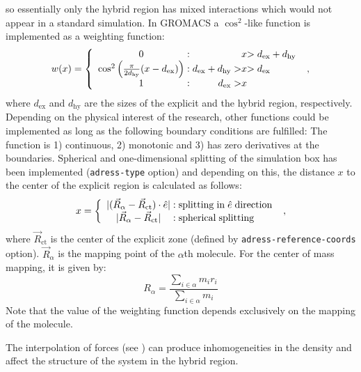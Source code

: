 so essentially  only the hybrid region has mixed interactions which would not appear in a standard simulation.
In GROMACS a $\cos^2$-like function is implemented as a weighting function:
\begin{equation}
w(x)=
\left\{\begin{array}{c@{\;:\;}r@{x}l}
0&&>d_\mathrm{ex}+d_\mathrm{hy}\\
\cos^2\left(\frac{\pi}{2d_\mathrm{hy}}(x-d_\mathrm{ex})\right)&d_\mathrm{ex}+d_\mathrm{hy}>&>d_\mathrm{ex}\\
1&d_\mathrm{ex}>&
\end{array}\right.~,
\label{equ:wf}
\end{equation}
where $d_\mathrm{ex}$ and $d_\mathrm{hy}$ are the sizes of the explicit and the hybrid region, respectively.
Depending on the physical interest of the research, other functions could be implemented as long as the following boundary conditions are fulfilled:
The function is 1) continuous, 2) monotonic and 3) has zero derivatives at the boundaries.
Spherical and one-dimensional splitting  of the simulation box has been implemented ({\tt adress-type} option)
and depending on this, the distance $x$ to the center of the explicit region is calculated as follows:
\begin{equation}
x=
\left\{
\begin{array}{c@{\;:\;}l}
  |(\vec{R}_\alpha-\vec{R}_\mathrm{ct})\cdot\hat{e}|&\mathrm{splitting\;in\;}\hat{e}\mathrm{\;direction}\\
|\vec{R}_\alpha-\vec{R}_\mathrm{ct}|&\mathrm{spherical\;splitting}
\end{array}
\right.~,
\end{equation}
where $\vec{R}_\mathrm{ct}$ is the center of the explicit zone (defined by {\tt adress-reference-coords} option). $\vec{R}_\alpha$ is the mapping point of the $\alpha$th molecule. For the center of mass mapping, it is given by:
\begin{equation}
R_\alpha=\frac{\sum_{i\in\alpha}m_i r_i}{\sum_{i\in\alpha}m_i}
\label{equ:com-def}
\end{equation}
Note that the value of the weighting function depends exclusively on the mapping of the molecule.

The interpolation of forces (see ) can produce inhomogeneities in the density and affect the structure of the system in the hybrid region.


